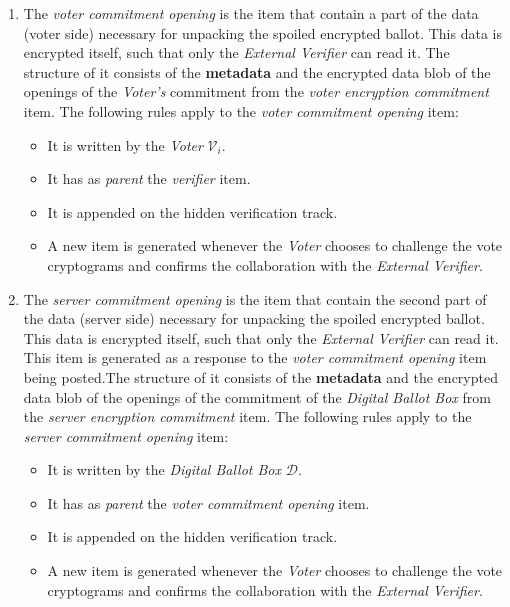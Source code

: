 \begin{enumerate}
    \item
        The \textit{voter commitment opening} is the item that contain a part of the data (voter side) necessary for unpacking the spoiled encrypted ballot. This data is encrypted itself, such that only the \textit{External Verifier} can read it. The structure of it consists of the \textbf{metadata} and the encrypted data blob of the openings of the \textit{Voter's} commitment from the \textit{voter encryption commitment} item. The following rules apply to the \textit{voter commitment opening} item:
        \begin{itemize}
            \item It is written by the \textit{Voter} $\mathcal{V}_i$.
            \item It has as \textit{parent} the \textit{verifier} item.
            \item It is appended on the hidden verification track.
            \item A new item is generated whenever the \textit{Voter} chooses to challenge the vote cryptograms and confirms the collaboration with the \textit{External Verifier}.
        \end{itemize}
    
    \item
        The \textit{server commitment opening} is the item that contain the second part of the data (server side) necessary for unpacking the spoiled encrypted ballot. This data is encrypted itself, such that only the \textit{External Verifier} can read it. This item is generated as a response to the \textit{voter commitment opening} item being posted.The structure of it consists of the \textbf{metadata} and the encrypted data blob of the openings of the commitment of the \textit{Digital Ballot Box} from the \textit{server encryption commitment} item. The following rules apply to the \textit{server commitment opening} item:
        \begin{itemize}
            \item It is written by the \textit{Digital Ballot Box} $\mathcal{D}$.
            \item It has as \textit{parent} the \textit{voter commitment opening} item.
            \item It is appended on the hidden verification track.
            \item A new item is generated whenever the \textit{Voter} chooses to challenge the vote cryptograms and confirms the collaboration with the \textit{External Verifier}.
        \end{itemize}
\end{enumerate}
